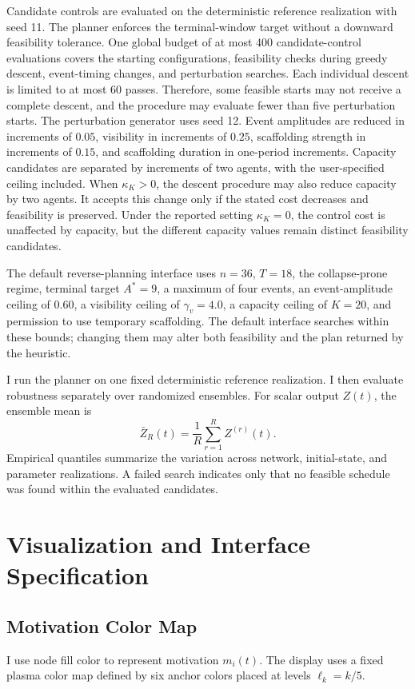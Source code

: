 \documentclass[11pt]{article}
\begin{document}
Candidate controls are evaluated on the deterministic reference realization with seed 11. The planner enforces the terminal-window target without a downward feasibility tolerance. One global budget of at most 400 candidate-control evaluations covers the starting configurations, feasibility checks during greedy descent, event-timing changes, and perturbation searches. Each individual descent is limited to at most 60 passes. Therefore, some feasible starts may not receive a complete descent, and the procedure may evaluate fewer than five perturbation starts. The perturbation generator uses seed 12. Event amplitudes are reduced in increments of $0.05$, visibility in increments of $0.25$, scaffolding strength in increments of $0.15$, and scaffolding duration in one-period increments. Capacity candidates are separated by increments of two agents, with the user-specified ceiling included. When $\kappa_K>0$, the descent procedure may also reduce capacity by two agents. It accepts this change only if the stated cost decreases and feasibility is preserved. Under the reported setting $\kappa_K=0$, the control cost is unaffected by capacity, but the different capacity values remain distinct feasibility candidates.

The default reverse-planning interface uses $n=36$, $T=18$, the collapse-prone regime, terminal target $A^*=9$, a maximum of four events, an event-amplitude ceiling of $0.60$, a visibility ceiling of $\gamma_v=4.0$, a capacity ceiling of $K=20$, and permission to use temporary scaffolding. The default interface searches within these bounds; changing them may alter both feasibility and the plan returned by the heuristic.

I run the planner on one fixed deterministic reference realization. I then evaluate robustness separately over randomized ensembles. For scalar output $Z(t)$, the ensemble mean is
\[
\bar{Z}_R(t)=\frac{1}{R}\sum_{r=1}^RZ^{(r)}(t).
\]
Empirical quantiles summarize the variation across network, initial-state, and parameter realizations. A failed search indicates only that no feasible schedule was found within the evaluated candidates.

\appendix
\section{Visualization and Interface Specification}
\subsection{Motivation Color Map}
I use node fill color to represent motivation $m_i(t)$. The display uses a fixed plasma color map defined by six anchor colors placed at levels $\ell_k=k/5$.
\end{document}
